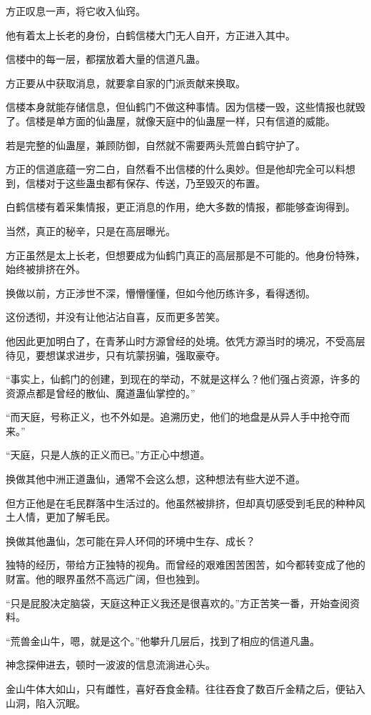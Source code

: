 \begin{this_body}
方正叹息一声，将它收入仙窍。

他有着太上长老的身份，白鹤信楼大门无人自开，方正进入其中。

信楼中的每一层，都摆放着大量的信道凡蛊。

方正要从中获取消息，就要拿自家的门派贡献来换取。

信楼本身就能存储信息，但仙鹤门不做这种事情。因为信楼一毁，这些情报也就毁了。信楼是单方面的仙蛊屋，就像天庭中的仙蛊屋一样，只有信道的威能。

若是完整的仙蛊屋，兼顾防御，自然就不需要两头荒兽白鹤守护了。

方正的信道底蕴一穷二白，自然看不出信楼的什么奥妙。但是他却完全可以料想到，信楼对于这些蛊虫都有保存、传送，乃至毁灭的布置。

白鹤信楼有着采集情报，更正消息的作用，绝大多数的情报，都能够查询得到。

当然，真正的秘辛，只是在高层曝光。

方正虽然是太上长老，但想要成为仙鹤门真正的高层那是不可能的。他身份特殊，始终被排挤在外。

换做以前，方正涉世不深，懵懵懂懂，但如今他历练许多，看得透彻。

这份透彻，并没有让他沾沾自喜，反而更多苦笑。

他因此更加明白了，在青茅山时方源曾经的处境。依凭方源当时的境况，不受高层待见，要想谋求进步，只有坑蒙拐骗，强取豪夺。

“事实上，仙鹤门的创建，到现在的举动，不就是这样么？他们强占资源，许多的资源点都是曾经的散仙、魔道蛊仙掌控的。”

“而天庭，号称正义，也不外如是。追溯历史，他们的地盘是从异人手中抢夺而来。”

“天庭，只是人族的正义而已。”方正心中想道。

换做其他中洲正道蛊仙，通常不会这么想，这种想法有些大逆不道。

但方正他是在毛民群落中生活过的。他虽然被排挤，但却真切感受到毛民的种种风土人情，更加了解毛民。

换做其他蛊仙，怎可能在异人环伺的环境中生存、成长？

独特的经历，带给方正独特的视角。而曾经的艰难困苦困苦，如今都转变成了他的财富。他的眼界虽然不高远广阔，但也独到。

“只是屁股决定脑袋，天庭这种正义我还是很喜欢的。”方正苦笑一番，开始查阅资料。

“荒兽金山牛，嗯，就是这个。”他攀升几层后，找到了相应的信道凡蛊。

神念探伸进去，顿时一波波的信息流淌进心头。

金山牛体大如山，只有雌性，喜好吞食金精。往往吞食了数百斤金精之后，便钻入山洞，陷入沉眠。


\end{this_body}
